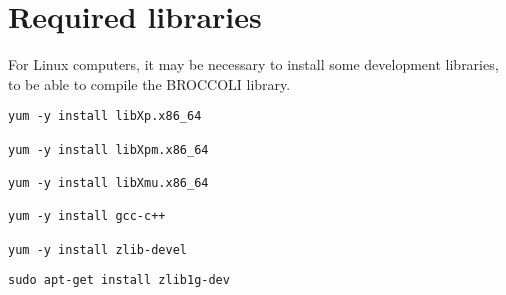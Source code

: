 \section{Required libraries}

For Linux computers, it may be necessary to install some development libraries, to be able to compile the BROCCOLI library.

\begin{verbatim}
yum -y install libXp.x86_64

yum -y install libXpm.x86_64

yum -y install libXmu.x86_64
 
yum -y install gcc-c++
 
yum -y install zlib-devel
\end{verbatim}

\begin{verbatim}
sudo apt-get install zlib1g-dev
\end{verbatim}




